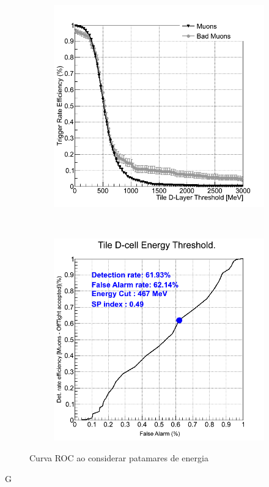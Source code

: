 \begin{figure}[htpb!]
        \centering
        \begin{subfigure}[b]{0.45\textwidth}
                \centering
                \includegraphics[width=\textwidth]{images/minbias/C.png}
        \end{subfigure}%
        ~
        \begin{subfigure}[b]{0.45\textwidth}
                \centering
                \includegraphics[width=\textwidth]{images/minbias/C_roc.png}
        \end{subfigure}
        \caption{Curva ROC ao considerar patamares de energia}
        \label{fig:ROCEnergyminbias}
\end{figure}G

